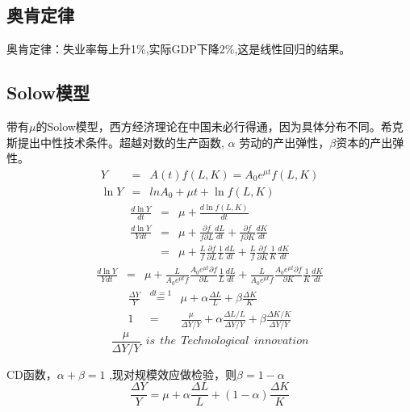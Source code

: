 \subsection{奥肯定律}

奥肯定律：失业率每上升1\%,实际GDP下降2\%,这是线性回归的结果。

\subsection{Solow模型}
 带有$\mu$的Solow模型，西方经济理论在中国未必行得通，因为具体分布不同。希克斯提出中性技术条件。超越对数的生产函数,  \quad $\alpha$ 劳动的产出弹性，$\beta$资本的产出弹性。
	\begin{eqnarray}
		Y & = & A(t)f(L,K) =A_{0}e^{\mu t}f(L,K)  \nonumber \\
		\ln Y & = & lnA_{0} + \mu t + \ln f(L,K) 
	\end{eqnarray}
	\begin{eqnarray}
		\frac{d\ln Y} {dt} & = & \mu + \frac{d\ln f(L,K)}{dt}  \nonumber   \\
		\frac{d\ln Y} {Ydt}& = & \mu + \frac{\partial f}{f\partial L} \frac{dL}{dt} +\frac{\partial f}{f\partial K} \frac{dK}{dt} \nonumber \\ 
		& = & \mu +\frac{L}{f} \frac{\partial f}{\partial L} \frac{1}{L} \frac{dL}{dt} +
		\frac{L}{f} \frac{\partial f}{\partial K}\frac{1}{K} \frac{dK}{dt} \nonumber 
	\end{eqnarray}
	\begin{eqnarray}
		\frac{d \ln Y} {Ydt} & = & \mu + \frac{L}{A_{0}e^{\mu t}f} \frac{A_{0}e^{\mu t} \partial f}{\partial L} 
		\frac{1}{L} \frac{dL}{dt} +\frac{L}{A_{0}e^{\mu t}f} \frac{A_{0}e^{\mu t} \partial f}{\partial K}\frac{1}{K} \frac{dK}{dt} 
	\end{eqnarray}
	\begin{eqnarray}	
	\frac{\Delta Y} {Y}	& \stackrel{dt = 1}{=} &  \mu + \alpha \frac{\Delta L} {L} + \beta \frac{\Delta K} {K} \nonumber   \\
		1 &	=  &  \frac{\mu} {\Delta Y/Y} + \alpha \frac{\Delta L/L} {\Delta Y/Y} + \beta \frac{\Delta K/K} {\Delta Y/Y} \nonumber  
	\end{eqnarray} 
$$ \frac{\mu} {\Delta Y/Y}  \ \ is \ \ the \ \ Technological \ \ innovation $$ 

CD函数，$\alpha+ \beta = 1$ ,现对规模效应做检验，则$\beta = 1 - \alpha$
$$ 	\frac{\Delta Y} {Y}	=  \mu + \alpha \frac{\Delta L} {L} + (1 - \alpha) \frac{\Delta K} {K} \nonumber $$